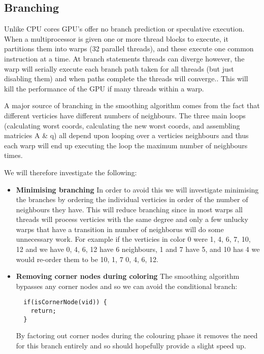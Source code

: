\subsection*{Branching}
Unlike CPU cores GPU's offer no branch prediction or speculative execution.
When a multiprocessor is given one or more thread blocks to execute, it partitions them into warps (32 parallel threads), and these execute one common instruction at a time.
At branch statements threads can diverge however, the warp will serially execute each branch path taken for all threads (but just disabling them) and when paths complete the threads will converge.\cite{cuda_guide}. This will kill the performance of the GPU if many threads within a warp.

A major source of branching in the smoothing algorithm comes from the fact that different verticies have different numbers of neighbours. The three main loops (calculating worst coords, calculating the new worst coords, and assembling matricies A \& q) all depend upon looping over a verticies neighbours and thus each warp will end up executing the loop the maximum number of neighbours times.

We will therefore investigate the following:
\begin{itemize}
  \item \textbf{Minimising branching}
                In order to avoid this we will investigate minimising the branches by ordering the individual verticies in order of the number of neighbours they have. This will reduce branching since in most warps all threads will process verticies with the same degree and only a few unlucky warps that have a transition in number of neighborus will do some unnecessary work.
                For example if the verticies in color 0 were 1, 4, 6, 7, 10, 12 and we have 0, 4, 6, 12 have 6 neighbours, 1 and 7 have 5, and 10 has 4 we would re-order them to be 10, 1, 7 0, 4, 6, 12.

  \item \textbf{Removing corner nodes during coloring}
                The smoothing algorithm bypasses any corner nodes and so we can avoid the conditional branch:
                \begin{verbatim}
  if(isCornerNode(vid)) {
    return;
  }
                \end{verbatim}
                By factoring out corner nodes during the colouring phase it removes the need for this branch entirely and so should hopefully provide a slight speed up.
\end{itemize}
